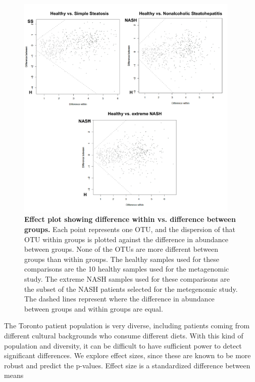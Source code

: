 \begin{figure}[h]
\begin{center}
\includegraphics[width=0.95\textwidth]{nafld_16s_aldex.png}
\caption[Effect plot showing difference within vs. difference between groups.]{\textbf{Effect plot showing difference within vs. difference between groups.} Each point represents one OTU, and the dispersion of that OTU within groups is plotted against the difference in abundance between groups. None of the OTUs are more different between groups than within groups. The healthy samples used for these comparisons are the 10 healthy samples used for the metagenomic study. The extreme NASH samples used for these comparisons are the subset of the NASH patients selected for the metegenomic study. The dashed lines represent where the difference in abundance between groups and within groups are equal.}
\label{nafld_fig3}
\end{center}
\end{figure}

The Toronto patient population is very diverse, including patients coming from different cultural backgrounds who consume different diets. With this kind of population and diversity, it can be difficult to have sufficient power to detect significant differences. We explore effect sizes, since these are known to be more robust and predict the p-values. Effect size is a standardized difference between means

